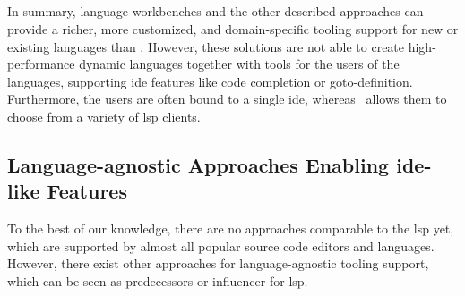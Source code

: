     \subparagraph{}
    In summary, language workbenches and the other described approaches can provide a richer, more customized, and domain-specific tooling support for new or existing languages than \graallsp. However, these solutions are not able to create high-performance dynamic languages together with tools for the users of the languages, supporting \ac{ide} features like code completion or goto-definition. Furthermore, the users are often bound to a single \ac{ide}, whereas \graallsp~allows them to choose from a variety of \ac{lsp} clients.


\subsection{Language-agnostic Approaches Enabling \ac{ide}-like Features}
    To the best of our knowledge, there are no approaches comparable to the \acl{lsp} yet, which are supported by almost all popular source code editors and languages. However, there exist other approaches for language-agnostic tooling support, which can be seen as predecessors or influencer for \ac{lsp}.

